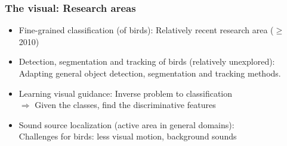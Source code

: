 \documentclass[mathserif]{beamer}
\begin{document}
\begin{frame}
\frametitle{The visual: Research areas}
\begin{itemize}
\item<2-> Fine-grained classification (of birds): Relatively recent research area ($\geq$ 2010)
\item<3-> Detection, segmentation and tracking of birds (relatively unexplored): \\Adapting general object detection, segmentation and tracking methods.
\item<4-> Learning visual guidance: Inverse problem to classification \\$\Rightarrow$ Given the classes, find the discriminative features
\item<5-> Sound source localization (active area in general domains): \\Challenges for birds: less visual motion, background sounds
\end{itemize}
\end{frame}
\end{document}
